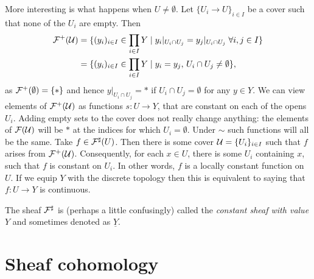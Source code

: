 \documentclass{article}
\begin{document}
\begin{example}
    More interesting is what happens when $U \neq \emptyset$.
    Let $\{U_i \to U\}_{i\in I}$ be a cover such that
    none of the $U_i$ are empty. Then
    \begin{align*}
        \mathcal{F}^+(\mathcal{U}) & =
        \{(y_i)_{i\in I}\in \prod_{i\in I} Y \mid
        y_i|_{U_i \cap U_j} = y_j|_{U_i \cap U_j}\; \forall i,j \in I\} \\
                     & = \{(y_i)_{i\in I}\in \prod_{i\in I}Y\mid
        y_i = y_j,\, U_i \cap U_j \neq \emptyset\},
    \end{align*}
    as $\mathcal{F}^+(\emptyset) = \{*\}$ and hence $y|_{U_i \cap U_j} = *$
    if $U_i \cap U_j = \emptyset$ for any $y \in Y$.
    We can view elements of $\mathcal{F}^+(\mathcal{U})$ as functions $s\colon U \to Y$,
    that are constant on each of the opens $U_i$.
    Adding empty sets
    to the cover does not really change anything: the elements of
    $\mathcal{F}(\mathcal{U})$ will be $*$ at the indices for which $U_i = \emptyset$.
    Under $\sim$ such functions will all be the same.
    Take $f \in \mathcal{F}^\sharp(U)$. Then there is some cover
    $\mathcal{U} = \{U_i\}_{i\in I}$ such that $f$
    arises from $\mathcal{F}^+(\mathcal{U})$. Consequently, for each $x\in U$,
    there is some $U_i$ containing $x$, such that $f$
    is constant on $U_i$. In other words, $f$ is a locally
    constant function on $U$. If we equip $Y$ with the discrete
    topology then this is equivalent to saying that $f\colon U \to Y$
    is continuous.

    The sheaf $\mathcal{F}^\sharp$ is (perhaps a little confusingly) called the
    \emph{constant sheaf with value $Y$} and sometimes
    denoted as $\underline{Y}$.
\end{example}
\section{Sheaf cohomology}
\end{document}
